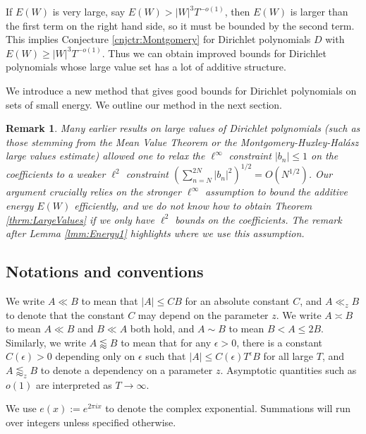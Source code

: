 \documentclass{amsart}
\theoremstyle{plain}
\newtheorem*{rmk}{Remark}
\numberwithin{equation}{section}
\begin{document}
If $E(W)$ is very large, say $E(W)> |W|^3T^{-o(1)}$, then $E(W)$ is larger than the first term on the right hand side, so it must be bounded by the second term. This implies Conjecture \ref{cnjctr:Montgomery} for Dirichlet polynomials $D$ with $E(W)\ge |W|^3 T^{-o(1)}$. Thus we can obtain improved bounds for Dirichlet polynomials whose large value set has a lot of additive structure.

We introduce a new method that gives good bounds for Dirichlet polynomials on sets of small energy.   We outline our method in the next section.

\begin{rmk}
Many earlier results on large values of Dirichlet polynomials (such as those stemming from the Mean Value Theorem or the Montgomery-Huxley-Hal\'asz large values estimate) allowed one to relax the $\ell^\infty$ constraint $|b_n|\le 1$ on the coefficients to a weaker $\ell^2$ constraint $(\sum_{n=N}^{2N}|b_n|^2)^{1/2}=O(N^{1/2})$. Our argument crucially relies on the stronger $\ell^\infty$ assumption to bound the additive energy $E(W)$ efficiently, and we do not know how to obtain Theorem \ref{thrm:LargeValues} if we only have $\ell^2$ bounds on the coefficients. The remark after Lemma \ref{lmm:Energy1} highlights where we use this assumption.
\end{rmk}


%
%

\subsection{Notations and conventions} \label{subsecdeltalessapprox}

We write $A \ll B$ to mean that $ |A| \le C B$ for an absolute constant $C$, and $A \ll_z B$ to denote that the constant $C$ may depend on the parameter $z$. We write $A\asymp B$ to mean $A\ll B$ and $B\ll A$ both hold, and $A\sim B$ to mean $B<A\le 2B$. Similarly,  we write $A \lessapprox B$ to mean that for any $\epsilon > 0$, there is a constant $C(\epsilon)>0$ depending only on $\epsilon$ such that $|A| \le C(\epsilon) T^{\epsilon} B$ for all large $T$, and $A \lessapprox_z B$ to denote a dependency on a parameter $z$. Asymptotic quantities such as $o(1)$ are interpreted as $T\rightarrow \infty$.

We use $e(x):=e^{2\pi i x}$ to denote the complex exponential. Summations will run over integers unless specified otherwise.

%
%
\end{document}
